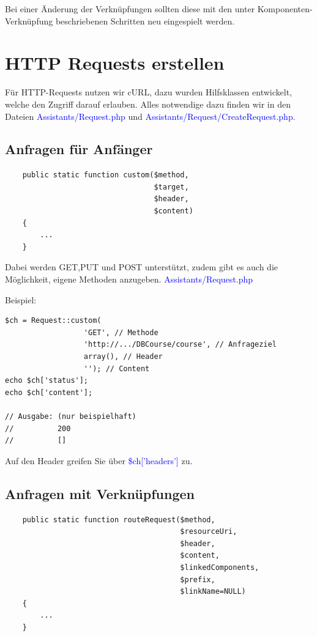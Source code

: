 \documentclass[10pt,a4paper,final,parskip]{scrartcl}
\newcommand{\blau}[1]{\textcolor{blue}{#1}}
\begin{document}
Bei einer Änderung der Verknüpfungen sollten diese mit den unter Komponenten-Verknüpfung beschriebenen Schritten neu eingespielt werden.
  
\section{HTTP Requests erstellen}
Für HTTP-Requests nutzen wir cURL, dazu wurden Hilfsklassen entwickelt, welche den Zugriff darauf erlauben. Alles notwendige dazu finden wir in den Dateien \blau{Assistants/Request.php} und \blau{Assistants/Request/CreateRequest.php}.

\subsection{Anfragen für Anfänger}
\begin{minipage}{\textwidth}
\begin{lstlisting}
    public static function custom($method, 
                                  $target, 
                                  $header,  
                                  $content)
    {
        ...
    }
\end{lstlisting}
\end{minipage}

Dabei werden GET,PUT und POST unterstützt, zudem gibt es auch die Möglichkeit, eigene Methoden anzugeben.
\blau{Assistants/Request.php}

\begin{minipage}{\textwidth}
Beispiel:
\begin{lstlisting}
$ch = Request::custom(
                  'GET', // Methode
                  'http://.../DBCourse/course', // Anfrageziel
                  array(), // Header
                  ''); // Content
echo $ch['status'];
echo $ch['content']; 
                     
// Ausgabe: (nur beispielhaft)
//          200
//          []         
\end{lstlisting}
\end{minipage}
Auf den Header greifen Sie über \blau{\$ch['headers']} zu.

\subsection{Anfragen mit Verknüpfungen}
\begin{minipage}{\textwidth}
\begin{lstlisting}
    public static function routeRequest($method, 
                                        $resourceUri, 
                                        $header,  
                                        $content,
                                        $linkedComponents,
                                        $prefix,
                                        $linkName=NULL)
    {
        ...
    }
\end{lstlisting}
\end{minipage}
\end{document}
